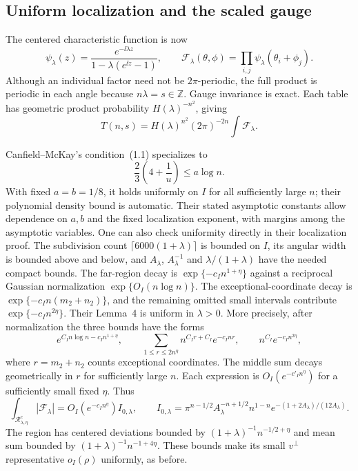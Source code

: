 \subsection{Uniform localization and the scaled gauge}
The centered characteristic function is now
\[
\psi_\lambda(z)=\frac{e^{-\ii\lambda z}}{1-\lambda(e^{\ii z}-1)},\qquad
\mathcal F_\lambda(\theta,\phi)=\prod_{i,j}\psi_\lambda(\theta_i+\phi_j).
\]
Although an individual factor need not be $2\pi$-periodic, the full product is periodic in each angle because $n\lambda=s\in\mathbb Z$. Gauge invariance is exact. Each table has geometric product probability $H(\lambda)^{-n^2}$, giving
\[
T(n,s)=H(\lambda)^{n^2}(2\pi)^{-2n}\int\mathcal F_\lambda.
\]

Canfield--McKay's condition~(1.1) specializes to
\[
\frac23\left(4+\frac1u\right)\leq a\log n.
\]
With fixed $a=b=1/8$, it holds uniformly on $I$ for all sufficiently large $n$; their polynomial density bound is automatic. Their stated asymptotic constants allow dependence on $a,b$ and the fixed localization exponent, with margins among the asymptotic variables. One can also check uniformity directly in their localization proof. The subdivision count $\lceil6000(1+\lambda)\rceil$ is bounded on $I$, its angular width is bounded above and below, and $A_\lambda$, $A_\lambda^{-1}$ and $\lambda/(1+\lambda)$ have the needed compact bounds. The far-region decay is $\exp\{-c_I n^{1+\eta}\}$ against a reciprocal Gaussian normalization $\exp\{O_I(n\log n)\}$. The exceptional-coordinate decay is $\exp\{-c_I n(m_2+n_2)\}$, and the remaining omitted small intervals contribute $\exp\{-c_I n^{2\eta}\}$. Their Lemma~4 is uniform in $\lambda>0$. More precisely, after normalization the three bounds have the forms
\[
 e^{C_I n\log n-c_I n^{1+\eta}},\qquad
 \sum_{1\leq r\leq2n^\eta}n^{C_Ir+C_I}e^{-c_Inr},\qquad
 n^{C_I}e^{-c_In^{2\eta}},
\]
where $r=m_2+n_2$ counts exceptional coordinates. The middle sum decays geometrically in $r$ for sufficiently large $n$. Each expression is $O_I(e^{-c'_In^\eta})$ for a sufficiently small fixed $\eta$. Thus
\begin{equation}\label{sqt:eq:densityminor}
\int_{\mathcal R_{\lambda,\eta}^c}|\mathcal F_\lambda|
 =O_I(e^{-c_I n^\eta})I_{0,\lambda},\qquad
I_{0,\lambda}=\pi^{n-1/2}A_\lambda^{-n+1/2}n^{1-n}
 e^{-(1+2A_\lambda)/(12A_\lambda)}.
\end{equation}
The region has centered deviations bounded by $(1+\lambda)^{-1}n^{-1/2+\eta}$ and mean sum bounded by $(1+\lambda)^{-1}n^{-1+4\eta}$. These bounds make its small $v^\perp$ representative $o_I(\rho)$ uniformly, as before.

